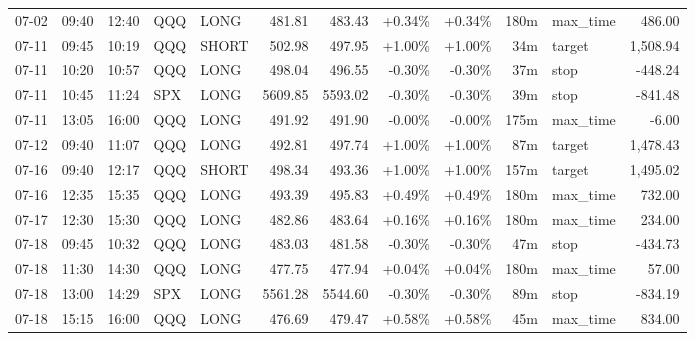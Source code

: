 \documentclass[11pt,a4paper,twoside]{article}
\begin{document}
\begin{center}
\begin{longtable}{>{\color{txtmain}}l l l l l r r r r r >{\color{txtmain}}l r}
07-02 & 09:40 & 12:40 & QQQ & LONG & 481.81 & 483.43 & \textcolor{wingreen}{+0.34\%} & \textcolor{wingreen}{+0.34\%} & 180m & max\_time & \textcolor{wingreen}{486.00} \\
07-11 & 09:45 & 10:19 & QQQ & SHORT & 502.98 & 497.95 & \textcolor{wingreen}{+1.00\%} & \textcolor{wingreen}{+1.00\%} & 34m & target & \textcolor{wingreen}{1,508.94} \\
07-11 & 10:20 & 10:57 & QQQ & LONG & 498.04 & 496.55 & \textcolor{lossred}{-0.30\%} & \textcolor{lossred}{-0.30\%} & 37m & stop & \textcolor{lossred}{-448.24} \\
07-11 & 10:45 & 11:24 & SPX & LONG & 5609.85 & 5593.02 & \textcolor{lossred}{-0.30\%} & \textcolor{lossred}{-0.30\%} & 39m & stop & \textcolor{lossred}{-841.48} \\
07-11 & 13:05 & 16:00 & QQQ & LONG & 491.92 & 491.90 & \textcolor{lossred}{-0.00\%} & \textcolor{lossred}{-0.00\%} & 175m & max\_time & \textcolor{lossred}{-6.00} \\
07-12 & 09:40 & 11:07 & QQQ & LONG & 492.81 & 497.74 & \textcolor{wingreen}{+1.00\%} & \textcolor{wingreen}{+1.00\%} & 87m & target & \textcolor{wingreen}{1,478.43} \\
07-16 & 09:40 & 12:17 & QQQ & SHORT & 498.34 & 493.36 & \textcolor{wingreen}{+1.00\%} & \textcolor{wingreen}{+1.00\%} & 157m & target & \textcolor{wingreen}{1,495.02} \\
07-16 & 12:35 & 15:35 & QQQ & LONG & 493.39 & 495.83 & \textcolor{wingreen}{+0.49\%} & \textcolor{wingreen}{+0.49\%} & 180m & max\_time & \textcolor{wingreen}{732.00} \\
07-17 & 12:30 & 15:30 & QQQ & LONG & 482.86 & 483.64 & \textcolor{wingreen}{+0.16\%} & \textcolor{wingreen}{+0.16\%} & 180m & max\_time & \textcolor{wingreen}{234.00} \\
07-18 & 09:45 & 10:32 & QQQ & LONG & 483.03 & 481.58 & \textcolor{lossred}{-0.30\%} & \textcolor{lossred}{-0.30\%} & 47m & stop & \textcolor{lossred}{-434.73} \\
07-18 & 11:30 & 14:30 & QQQ & LONG & 477.75 & 477.94 & \textcolor{wingreen}{+0.04\%} & \textcolor{wingreen}{+0.04\%} & 180m & max\_time & \textcolor{wingreen}{57.00} \\
07-18 & 13:00 & 14:29 & SPX & LONG & 5561.28 & 5544.60 & \textcolor{lossred}{-0.30\%} & \textcolor{lossred}{-0.30\%} & 89m & stop & \textcolor{lossred}{-834.19} \\
07-18 & 15:15 & 16:00 & QQQ & LONG & 476.69 & 479.47 & \textcolor{wingreen}{+0.58\%} & \textcolor{wingreen}{+0.58\%} & 45m & max\_time & \textcolor{wingreen}{834.00} \\

\end{longtable}
\end{center}
\end{document}
